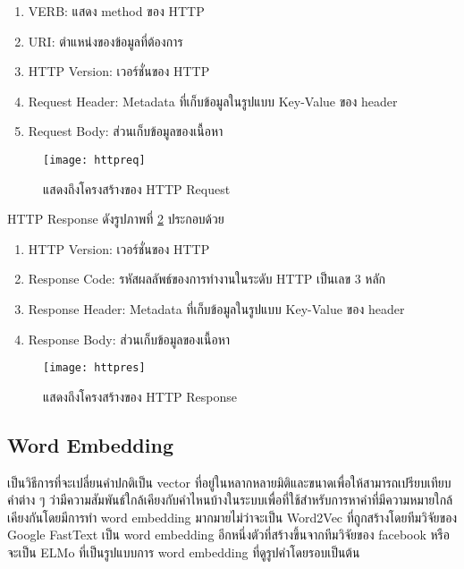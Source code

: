 \begin{enumerate}
 \item VERB: แสดง method ของ HTTP
 \item URI: ตำแหน่งของข้อมูลที่ต้องการ
 \item HTTP Version: เวอร์ชั่นของ HTTP
 \item Request Header: Metadata ที่เก็บข้อมูลในรูปแบบ Key-Value ของ header
 \item Request Body: ส่วนเก็บข้อมูลของเนื้อหา
\end{enumerate}

\begin{figure}[H]
    \centering
    \texttt{[image: httpreq]}
    \caption{แสดงถึงโครงสร้างของ HTTP Request \cite{Saixiii}}\label{fig:httpreq}
\end{figure}

HTTP Response ดังรูปภาพที่ \ref{fig:httpres} ประกอบด้วย


\begin{enumerate}
	\item HTTP Version: เวอร์ชั่นของ HTTP
	\item Response Code: รหัสผลลัพธ์ของการทำงานในระดับ HTTP เป็นเลข 3 หลัก
	\item Response Header: Metadata ที่เก็บข้อมูลในรูปแบบ Key-Value ของ header
	\item Response Body: ส่วนเก็บข้อมูลของเนื้อหา

   \end{enumerate}
   
   \begin{figure}[H]
       \centering
       \texttt{[image: httpres]}
       \caption{แสดงถึงโครงสร้างของ HTTP Response \cite{Saixiii}}\label{fig:httpres}
   \end{figure}

\subsection{Word Embedding}

เป็นวิธีการที่จะเปลี่ยนคำปกติเป็น vector ที่อยู่ในหลากหลายมิติและขนาดเพื่อให้สามารถเปรียบเทียบคำต่าง ๆ ว่ามีความสัมพันธ์ใกล้เคียงกับคำไหนบ้างในระบบเพื่อที่ใช้สำหรับการหาคำที่มีความหมายใกล้เคียงกันโดยมีการทำ word embedding มากมายไม่ว่าจะเป็น Word2Vec \cite{xin} \cite{Goldberg} ที่ถูกสร้างโดยทีมวิจัยของ Google FastText \cite{fasttext} เป็น word embedding อีกหนึ่งตัวที่สร้างขึ้นจากทีมวิจัยของ facebook หรือจะเป็น ELMo \cite{matthew} ที่เป็นรูปแบบการ word embedding ที่ดูรูปคำโดยรอบเป็นต้น 

